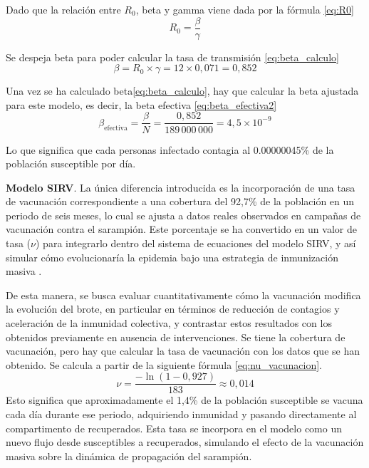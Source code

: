 Dado que la relación entre $R_0$, beta y gamma viene dada por la fórmula \eqref{eq:R0}
\begin{equation}
R_0 = \frac{\beta}{\gamma}
\label{eq:R0}
\end{equation}

Se despeja beta para poder calcular la tasa de transmisión \eqref{eq:beta_calculo}
\begin{equation}
\beta = R_0 \times \gamma = 12 \times 0{,}071 = 0{,}852
\label{eq:beta_calculo}
\end{equation}

Una vez se ha calculado beta\eqref{eq:beta_calculo}, hay que calcular la beta ajustada para este modelo, es decir, la beta efectiva \eqref{eq:beta_efectiva2}
\begin{equation}
\beta_{\text{efectiva}} = \frac{\beta}{N} = \frac{0{,}852}{189\,000\,000} = 4{,}5 \times 10^{-9}
\label{eq:beta_efectiva2}
\end{equation}

Lo que significa que cada personas infectado contagia al 0.00000045\% de la población susceptible por día.

\vspace{2em}
\textbf{Modelo SIRV}. La única diferencia introducida es la incorporación de una tasa de vacunación correspondiente a una cobertura del 92,7\% de la población en un periodo de seis meses, lo cual se ajusta a datos reales observados en campañas de vacunación contra el sarampión. Este porcentaje se ha convertido en un valor de tasa ($\nu$) para integrarlo dentro del sistema de ecuaciones del modelo SIRV, y así simular cómo evolucionaría la epidemia bajo una estrategia de inmunización masiva \cite{cdc_measles_cases_2025}.

De esta manera, se busca evaluar cuantitativamente cómo la vacunación modifica la evolución del brote, en particular en términos de reducción de contagios y aceleración de la inmunidad colectiva, y contrastar estos resultados con los obtenidos previamente en ausencia de intervenciones.
Se tiene la cobertura de vacunación, pero hay que calcular la tasa de vacunación con los datos que se han obtenido. Se calcula a partir de la siguiente fórmula \eqref{eq:nu_vacunacion}. 
\begin{equation}
\nu = \frac{-\ln(1 - 0{,}927)}{183} \approx 0{,}014
\label{eq:nu_vacunacion}
\end{equation}
Esto significa que aproximadamente el 1,4\% de la población susceptible se vacuna cada día durante ese periodo, adquiriendo inmunidad y pasando directamente al compartimento de recuperados. Esta tasa se incorpora en el modelo como un nuevo flujo desde susceptibles a recuperados, simulando el efecto de la vacunación masiva sobre la dinámica de propagación del sarampión.


